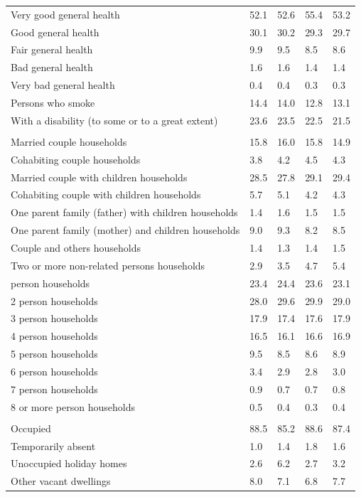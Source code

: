 \documentclass{article}
\begin{document}
\begin{table}[h]
\begin{tabular}{KTTTT}
    \hline
Very good general health & 52.1& 52.6&55.4& 53.2\\
Good general health & 30.1& 30.2& 29.3& 29.7\\
Fair general health & 9.9& 9.5&8.5& 8.6\\
Bad general health & 1.6& 1.6&1.4& 1.4\\
Very bad general health & 0.4& 0.4&0.3& 0.3\\
    \hline
Persons who smoke & 14.4& 14.0&12.8& 13.1\\
    \hline
With a disability (to some or to a great extent) & 23.6& 23.5&22.5& 21.5\\
\hline
    \\ 
    \hline
Married couple households & 15.8& 16.0& 15.8& 14.9\\
Cohabiting couple households & 3.8& 4.2& 4.5& 4.3\\
Married couple with children households & 28.5& 27.8& 29.1& 29.4\\
Cohabiting couple with children households & 5.7& 5.1& 4.2& 4.3\\
One parent family (father) with  children households & 1.4& 1.6& 1.5& 1.5\\
One parent family (mother) and children households & 9.0& 9.3& 8.2& 8.5\\
Couple and others households  & 1.4& 1.3& 1.4& 1.5\\
Two or more non-related persons households & 2.9& 3.5& 4.7& 5.4\\
     person households & 23.4& 24.4& 23.6& 23.1\\
2 person households & 28.0& 29.6& 29.9& 29.0\\
3 person households & 17.9& 17.4& 17.6& 17.9\\
4 person households & 16.5& 16.1& 16.6& 16.9\\
5 person households & 9.5& 8.5& 8.6& 8.9\\
6 person households & 3.4& 2.9& 2.8& 3.0\\
7 person households & 0.9& 0.7& 0.7& 0.8\\
8 or more person households & 0.5& 0.4& 0.3& 0.4\\
\hline
    \\ 
    \hline
Occupied & 88.5& 85.2& 88.6& 87.4\\
Temporarily absent & 1.0& 1.4& 1.8& 1.6\\
Unoccupied holiday homes & 2.6& 6.2& 2.7& 3.2\\
Other vacant dwellings & 8.0& 7.1& 6.8& 7.7\\
\hline
\end{tabular}
\end{table}
\end{document}
